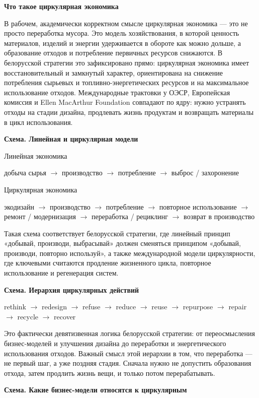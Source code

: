 \documentclass[14pt,a4paper]{extarticle}
\begin{document}
\textbf{Что такое циркулярная экономика}

В рабочем, академически корректном смысле циркулярная экономика --- это не просто переработка мусора. Это модель хозяйствования, в которой ценность материалов, изделий и энергии удерживается в обороте как можно дольше, а образование отходов и потребление первичных ресурсов снижаются. В белорусской стратегии это зафиксировано прямо: циркулярная экономика имеет восстановительный и замкнутый характер, ориентирована на снижение потребления сырьевых и топливно-энергетических ресурсов и на максимальное использование отходов. Международные трактовки у ОЭСР, Европейская комиссия и Ellen MacArthur Foundation совпадают по ядру: нужно устранять отходы на стадии дизайна, продлевать жизнь продуктам и возвращать материалы в цикл использования.

\textbf{Схема. Линейная и циркулярная модели}

Линейная экономика

добыча сырья $\rightarrow$ производство $\rightarrow$ потребление $\rightarrow$ выброс / захоронение

Циркулярная экономика

экодизайн $\rightarrow$ производство $\rightarrow$ потребление $\rightarrow$ повторное использование $\rightarrow$ ремонт / модернизация $\rightarrow$ переработка / рециклинг $\rightarrow$ возврат в производство

Такая схема соответствует белорусской стратегии, где линейный принцип «добывай, производи, выбрасывай» должен сменяться принципом «добывай, производи, повторно используй», а также международной модели циркулярности, где ключевыми считаются продление жизненного цикла, повторное использование и регенерация систем.

\textbf{Схема. Иерархия циркулярных действий}

rethink $\rightarrow$ redesign $\rightarrow$ refuse $\rightarrow$ reduce $\rightarrow$ reuse $\rightarrow$ repurpose $\rightarrow$ repair $\rightarrow$ recycle $\rightarrow$ recover

Это фактически девятизвенная логика белорусской стратегии: от переосмысления бизнес-моделей и улучшения дизайна до переработки и энергетического использования отходов. Важный смысл этой иерархии в том, что переработка --- не первый шаг, а уже поздняя стадия. Сначала нужно не допустить образования отхода, затем продлить жизнь вещи, и только потом перерабатывать.

\textbf{Схема. Какие бизнес-модели относятся к циркулярным}
\end{document}
